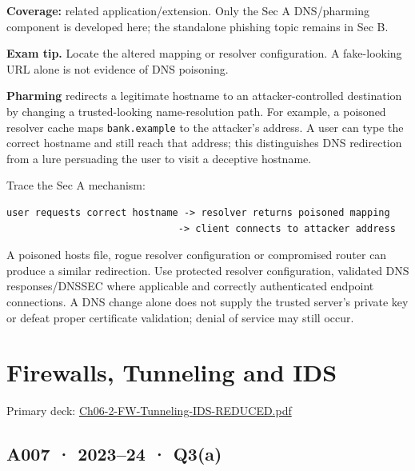 \documentclass[11pt,a4paper]{article}
\begin{document}
\textbf{Coverage:} related application/\allowbreak{}extension. Only the Sec A DNS/\allowbreak{}pharming component is developed here; the standalone phishing topic remains in Sec B.



{\color{ForestGreen}\textbf{Exam tip.} Locate the altered mapping or resolver configuration. A fake-looking URL alone is not evidence of DNS poisoning.}


\textbf{Pharming} redirects a legitimate hostname to an attacker-controlled destination by changing a trusted-looking name-resolution path. For example,\allowbreak{} a poisoned resolver cache maps \texttt{bank.\allowbreak{}example} to the attacker's address. A user can type the correct hostname and still reach that address; this distinguishes DNS redirection from a lure persuading the user to visit a deceptive hostname.


Trace the Sec A mechanism:



\begin{Verbatim}[breaklines=true,breakanywhere=true,fontsize=\small,frame=single,rulecolor=\color{PanelBorder}]
user requests correct hostname -> resolver returns poisoned mapping
                              -> client connects to attacker address
\end{Verbatim}

A poisoned hosts file,\allowbreak{} rogue resolver configuration or compromised router can produce a similar redirection. Use protected resolver configuration,\allowbreak{} validated DNS responses/\allowbreak{}DNSSEC where applicable and correctly authenticated endpoint connections. A DNS change alone does not supply the trusted server's private key or defeat proper certificate validation; denial of service may still occur.



\clearpage
\section{Firewalls,\allowbreak{} Tunneling and IDS}

Primary deck: \href{../slides/Ch06-2-FW-Tunneling-IDS-REDUCED.pdf}{Ch06-2-FW-Tunneling-IDS-REDUCED.\allowbreak{}pdf}




\subsection{A007 · 2023–24 · Q3(a)}\label{a007}
\end{document}
